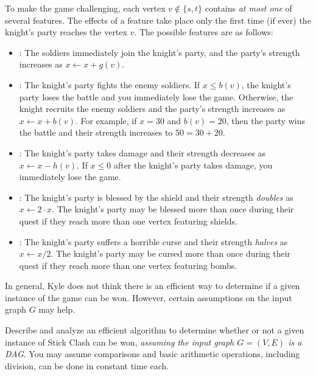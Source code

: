 \documentclass[11pt]{article}
\begin{document}
\begin{problems}
  To make the game challenging, each vertex \(v \notin \{s, t\}\) contains \emph{at most one} of
  several features.
  The effects of a feature take place only the first time (if ever) the knight's party reaches the
  vertex \(v\).
  The possible features are as follows:
  \begin{itemize}
    \item
      :
      The soldiers immediately join the knight's party, and the party's strength increases as \(x
      \gets x + g(v)\).
    \item
      :
      The knight's party fights the enemy soldiers.
      If \(x \leq b(v)\), the knight's party loses the battle and you immediately lose the game.
      Otherwise, the knight recruits the enemy soldiers and the party's strength increases as \(x
      \gets x + b(v)\).
      For example, if \(x = 30\) and \(b(v) = 20\), then the party wins the battle and their
      strength increases to \(50 = 30 + 20\).
    \item
      :
      The knight's party takes damage and their strength decreases as \(x \gets x - h(v)\).
      If \(x \leq 0\) after the knight's party takes damage, you immediately lose the game.
    \item
      :
      The knight's party is blessed by the shield and their strength \emph{doubles} as \(x \gets 2
      \cdot x\).
      The knight's party may be blessed more than once during their quest if they reach more than
      one vertex featuring shields.
    \item
      :
      The knight's party suffers a horrible curse and their strength \emph{halves} as \(x \gets x /
      2\).
      The knight's party may be cursed more than once during their quest if they reach more than one
      vertex featuring bombs.
  \end{itemize}
  In general, Kyle does not think there is an efficient way to determine if a given instance of the
  game can be won.
  However, certain assumptions on the input graph \(G\) may help.

  Describe and analyze an efficient algorithm to determine whether or not a given instance of Stick
  Clash can be won, \emph{assuming the input graph \(G = (V, E)\) is a DAG}.
  You may assume comparisons and basic arithmetic operations, including division, can be done in
  constant time each.


\end{problems}
\end{document}
